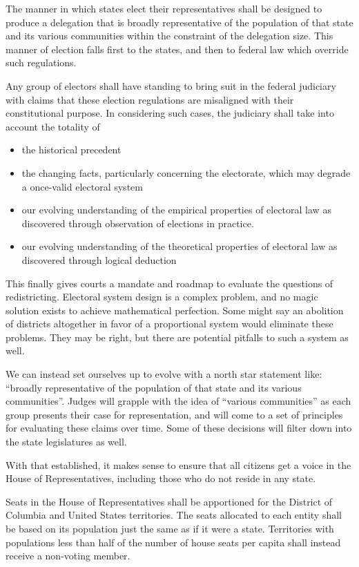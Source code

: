 \documentclass{article}
\newcommand{\quotes}[1]{``#1''}
\begin{document}
\begin{quoting}
The manner in which states elect their representatives shall be designed to produce a delegation that is broadly representative of the population of that state and its various communities within the constraint of the delegation size. This manner of election falls first to the states, and then to federal law which override such regulations.

Any group of electors shall have standing to bring suit in the federal judiciary with claims that these election regulations are misaligned with their constitutional purpose. In considering such cases, the judiciary shall take into account the totality of
\begin{itemize}
\item the historical precedent
\item the changing facts, particularly concerning the electorate, which may degrade a once-valid electoral system
\item our evolving understanding of the empirical properties of electoral law as discovered through observation of elections in practice.
\item our evolving understanding of the theoretical properties of electoral law as discovered through logical deduction
\end{itemize}
\end{quoting}

This finally gives courts a mandate and roadmap to evaluate the questions of redistricting. Electoral system design is a complex problem, and no magic solution exists to achieve mathematical perfection. Some might say an abolition of districts altogether in favor of a proportional system would eliminate these problems. They may be right, but there are potential pitfalls to such a system as well.

We can instead set ourselves up to evolve with a north star statement like: \quotes{broadly representative of the population of that state and its various communities}. Judges will grapple with the idea of \quotes{various communities} as each group presents their case for representation, and will come to a set of principles for evaluating these claims over time. Some of these decisions will filter down into the state legislatures as well.

With that established, it makes sense to ensure that all citizens get a voice in the House of Representatives, including those who do not reside in any state.

\begin{quoting}
Seats in the House of Representatives shall be apportioned for the District of Columbia and United States territories. The seats allocated to each entity shall be based on its population just the same as if it were a state. Territories with populations less than half of the number of house seats per capita shall instead receive a non-voting member.
\end{quoting}
\end{document}
